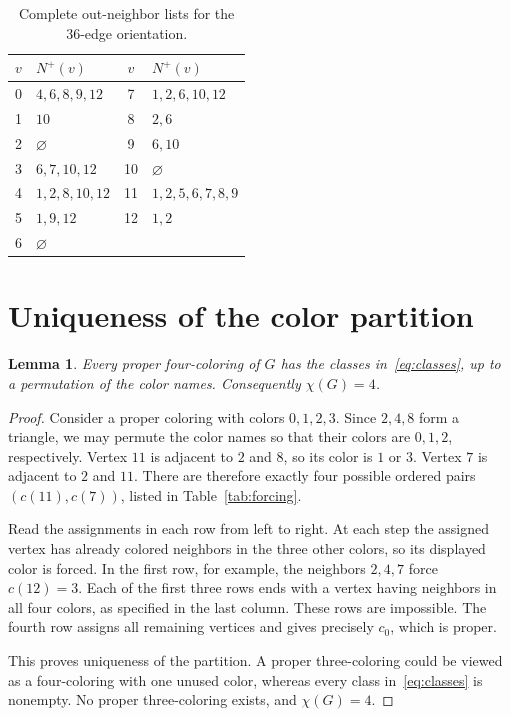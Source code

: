 \documentclass[11pt]{article}
\newtheorem{lemma}{Lemma}
\newcommand{\out}{N^{+}}
\begin{document}
\begin{table}[t]
\centering
\caption{Complete out-neighbor lists for the 36-edge orientation.}\label{tab:arcs}
\begin{tabular}{cl@{\qquad}cl}
\toprule
$v$&$\out(v)$&$v$&$\out(v)$\\
\midrule
0&$4,6,8,9,12$&7&$1,2,6,10,12$\\
1&$10$&8&$2,6$\\
2&$\varnothing$&9&$6,10$\\
3&$6,7,10,12$&10&$\varnothing$\\
4&$1,2,8,10,12$&11&$1,2,5,6,7,8,9$\\
5&$1,9,12$&12&$1,2$\\
6&$\varnothing$&&\\
\bottomrule
\end{tabular}
\end{table}

\section{Uniqueness of the color partition}
\begin{lemma}\label{lem:unique}
Every proper four-coloring of $G$ has the classes in~\eqref{eq:classes}, up to a permutation of the color names. Consequently $\chi(G)=4$.
\end{lemma}
\begin{proof}
Consider a proper coloring with colors $0,1,2,3$. Since $2,4,8$ form a triangle, we may permute the color names so that their colors are $0,1,2$, respectively. Vertex $11$ is adjacent to $2$ and $8$, so its color is $1$ or $3$. Vertex $7$ is adjacent to $2$ and $11$. There are therefore exactly four possible ordered pairs $(c(11),c(7))$, listed in Table~\ref{tab:forcing}.

Read the assignments in each row from left to right. At each step the assigned vertex has already colored neighbors in the three other colors, so its displayed color is forced. In the first row, for example, the neighbors $2,4,7$ force $c(12)=3$. Each of the first three rows ends with a vertex having neighbors in all four colors, as specified in the last column. These rows are impossible. The fourth row assigns all remaining vertices and gives precisely $c_0$, which is proper.

This proves uniqueness of the partition. A proper three-coloring could be viewed as a four-coloring with one unused color, whereas every class in~\eqref{eq:classes} is nonempty. No proper three-coloring exists, and $\chi(G)=4$.
\end{proof}
\end{document}
